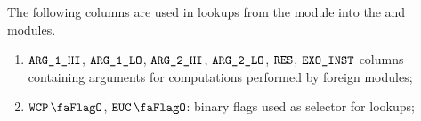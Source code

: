 The following columns are used in lookups from the \btcMod{} module into the \wcpMod{} and \eucMod{} modules.
\begin{enumerate}[resume]
	\item $\texttt{ARG}\texttt{\_1}\texttt{\_HI}$, $\texttt{ARG}\texttt{\_1}\texttt{\_LO}$, $\texttt{ARG}\texttt{\_2}\texttt{\_HI}$, $\texttt{ARG}\texttt{\_2}\texttt{\_LO}$, $\texttt{RES}$, $\texttt{EXO\_INST}$
		columns containing arguments for computations performed by foreign modules;
	\item $\wcpFlag$, $\eucFlag$:
		binary flags used as selector for lookups;
\end{enumerate}
